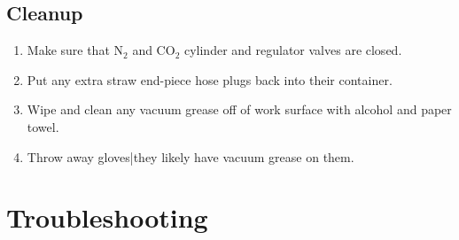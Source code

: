 \documentclass[A4,12pt]{article}
\begin{document}
\subsection{Cleanup}
	\begin{enumerate}
		\item Make sure that N$_2$ and CO$_2$ cylinder and regulator valves are closed.
		\item Put any extra straw end-piece hose plugs back into their container.
		\item Wipe and clean any vacuum grease off of work surface with alcohol and paper towel.
		\item Throw away gloves|they likely have vacuum grease on them.
	\end{enumerate}



\section{Troubleshooting}
\end{document}
